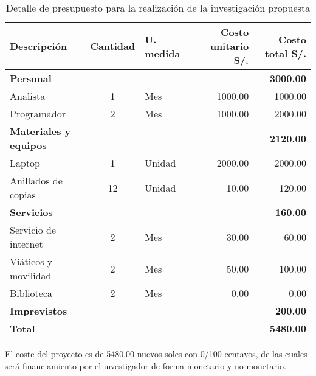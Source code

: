 \begin{table}[ht]
\caption{Detalle de presupuesto para la realización de la investigación propuesta}
\label{tab:presupuesto}
\begin{tabular}{lclrr}
\hline
\textbf{Descripción}&\textbf{Cantidad}&\textbf{U. medida}&\textbf{Costo unitario S/.}&\textbf{Costo total S/.}\\
\hline
\textbf{Personal} & & & & \textbf{3000.00}\\
Analista & 1 & Mes & 1000.00 & 1000.00\\
Programador & 2 & Mes & 1000.00 & 2000.00\\

\textbf{Materiales y equipos} & & & & \textbf{2120.00}\\
Laptop & 1 & Unidad & 2000.00 & 2000.00\\
Anillados de copias & 12 & Unidad & 10.00 & 120.00\\

\textbf{Servicios} & & & & \textbf{160.00}\\
Servicio de internet & 2 & Mes & 30.00 & 60.00\\
Viáticos y movilidad & 2 & Mes & 50.00 & 100.00\\
Biblioteca & 2 & Mes & 0.00 & 0.00\\
\textbf{Imprevistos} & & & & \textbf{200.00}\\
\textbf{Total} & & & & \textbf{5480.00}\\
\hline 
\end{tabular}
\end{table}

El coste del proyecto es de 5480.00 nuevos soles con 0/100 centavos, de las cuales será financiamiento por el investigador de forma monetario y no monetario.